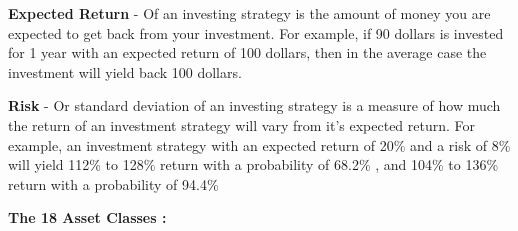 \documentclass{article}
\begin{document}
\textbf{Expected Return} - Of an investing strategy is the amount of money you are expected to get back from your investment. For example, if 90 dollars is invested for 1 year with an expected return of 100 dollars, then in the average case the investment will yield back 100 dollars.


\vspace{.5cm}

\noindent \textbf{Risk} - Or standard deviation of an investing strategy is a measure of how much the return of an investment strategy will vary from it's expected return. For example, an investment strategy with an expected return of 20\% and a risk of 8\% will yield 112\% to 128\% return with a probability of 68.2\% , and 104\% to 136\% return with a probability of 94.4\%

\vspace{1cm}
\large
\noindent \textbf{The 18 Asset Classes : }
\normalsize
\vspace{.5cm}
\end{document}
